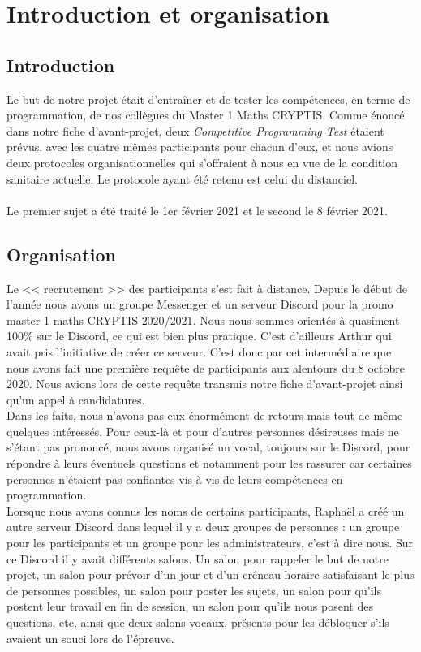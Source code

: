 \documentclass[12pt]{article}
\begin{document}
\tableofcontents
\pagebreak

\section{Introduction et organisation}

\subsection{Introduction}
Le but de notre projet était d'entraîner et de tester les compétences, en terme de programmation, de nos collègues du \textsf{Master 1 Maths CRYPTIS}. Comme énoncé dans notre fiche d'avant-projet, deux \textsl{Competitive Programming Test} étaient prévus, avec les quatre mêmes participants pour chacun d'eux, et nous avions deux protocoles organisationnelles qui s'offraient à nous en vue de la condition sanitaire actuelle. Le protocole ayant été retenu est celui du distanciel.\\
\\
Le premier sujet a été traité le 1er février 2021 et le second le 8 février 2021.

\subsection{Organisation}

Le << recrutement >> des participants s'est fait à distance. Depuis le début de l'année nous avons un groupe Messenger et un serveur Discord pour la promo master 1 maths CRYPTIS $2020$/$2021$. Nous nous sommes orientés à quasiment  100\% sur le Discord, ce qui est bien plus pratique. C'est d'ailleurs Arthur qui avait pris l'initiative de créer ce serveur. C'est donc par cet intermédiaire que nous avons fait une première requête de participants aux alentours du $8$ octobre $2020$. Nous avions lors de cette requête transmis notre fiche d'avant-projet ainsi qu'un appel à candidatures.
\vspace{12pt}\\
Dans les faits, nous n'avons pas eux énormément de retours mais tout de même quelques intéressés. Pour ceux-là et pour d'autres personnes désireuses mais ne s'étant pas prononcé, nous avons organisé un vocal, toujours sur le Discord, pour répondre à leurs éventuels questions et notamment pour les rassurer car certaines personnes n'étaient pas confiantes vis à vis de leurs compétences en programmation.\\
Lorsque nous avons connus les noms de certains participants, Raphaël a créé un autre serveur Discord dans lequel il y a deux groupes de personnes : un groupe pour les participants et un groupe pour les administrateurs, c'est à dire nous. Sur ce Discord il y avait différents salons. Un salon pour rappeler le but de notre projet, un salon pour prévoir d'un jour et d'un créneau horaire satisfaisant le plus de personnes possibles, un salon pour poster les sujets, un salon pour qu'ils postent leur travail en fin de session, un salon pour qu'ils nous posent des questions, etc, ainsi que deux salons vocaux, présents pour les débloquer s'ils avaient un souci lors de l'épreuve.\\
\end{document}
